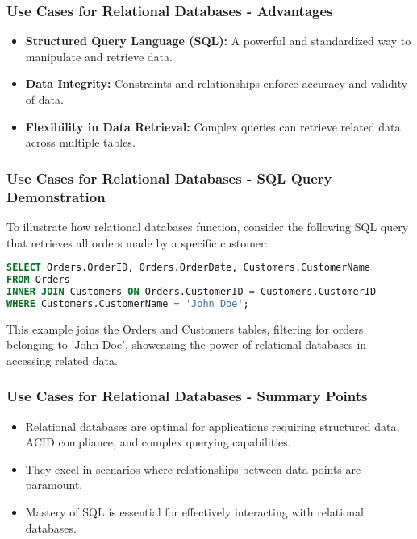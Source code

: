 \documentclass[aspectratio=169]{beamer}
\begin{document}
\begin{frame}[fragile]
    \frametitle{Use Cases for Relational Databases - Advantages}
    \begin{itemize}
        \item \textbf{Structured Query Language (SQL):} A powerful and standardized way to manipulate and retrieve data.
        \item \textbf{Data Integrity:} Constraints and relationships enforce accuracy and validity of data.
        \item \textbf{Flexibility in Data Retrieval:} Complex queries can retrieve related data across multiple tables.
    \end{itemize}
\end{frame}

\begin{frame}[fragile]
    \frametitle{Use Cases for Relational Databases - SQL Query Demonstration}
    To illustrate how relational databases function, consider the following SQL query that retrieves all orders made by a specific customer:
    \begin{lstlisting}[language=SQL]
SELECT Orders.OrderID, Orders.OrderDate, Customers.CustomerName
FROM Orders
INNER JOIN Customers ON Orders.CustomerID = Customers.CustomerID
WHERE Customers.CustomerName = 'John Doe';
    \end{lstlisting}
    This example joins the Orders and Customers tables, filtering for orders belonging to 'John Doe', showcasing the power of relational databases in accessing related data.
\end{frame}

\begin{frame}[fragile]
    \frametitle{Use Cases for Relational Databases - Summary Points}
    \begin{itemize}
        \item Relational databases are optimal for applications requiring structured data, ACID compliance, and complex querying capabilities.
        \item They excel in scenarios where relationships between data points are paramount.
        \item Mastery of SQL is essential for effectively interacting with relational databases.
    \end{itemize}
\end{frame}
\end{document}
